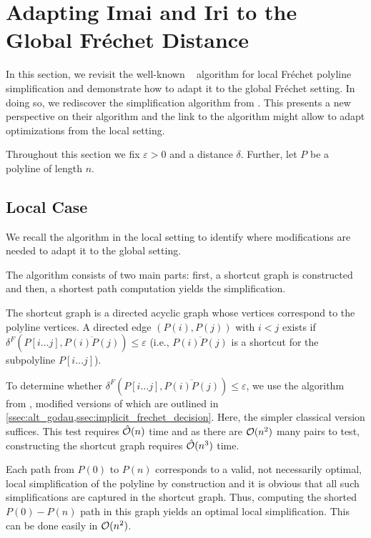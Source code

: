 \section{Adapting Imai and Iri to the Global Fréchet Distance}
\label{sec:global_imai_iri}

In this section, we revisit the well-known \citeauthor{computational_geometric_methods_for_polygonal_approximations_of_a_curve}~\cite{computational_geometric_methods_for_polygonal_approximations_of_a_curve} algorithm for local Fréchet polyline simplification and demonstrate how to adapt it to the global Fréchet setting. In doing so, we rediscover the simplification algorithm from \citeauthor{global_curve_simplification}. This presents a new perspective on their algorithm and the link to the \citeauthor{computational_geometric_methods_for_polygonal_approximations_of_a_curve} algorithm might allow to adapt optimizations from the local setting.

Throughout this section we fix \(\varepsilon > 0\) and a distance \(\delta\). Further, let \(P\) be a polyline of length \(n\).

\subsection{Local Case}

We recall the algorithm in the local setting to identify where modifications are needed to adapt it to the global setting. 

The algorithm consists of two main parts: first, a shortcut graph is constructed and then, a shortest path computation yields the simplification.

The shortcut graph is a directed acyclic graph whose vertices correspond to the polyline vertices. A directed edge \((P(i), P(j))\) with \(i < j\) exists if \(\delta^F(P[i \dots j], \overline{P(i)P(j)}) \leq \varepsilon\) (i.e., \(\overline{P(i)P(j)}\) is a shortcut for the subpolyline \(P[i \dots j]\)). 

To determine whether \(\delta^F(P[i \dots j], \overline{P(i)P(j)}) \leq \varepsilon\), we use the algorithm from \citeauthor{computing_the_frechet_distance_between_two_polygonal_curves}, modified versions of which are outlined in \cref{ssec:alt_godau,ssec:implicit_frechet_decision}. Here, the simpler classical version suffices. This test requires \(\hat{\mathcal{O}}(n)\) time and as there are \(\mathcal{O}(n^2)\) many pairs to test, constructing the shortcut graph requires \(\hat{\mathcal{O}}(n^3)\) time.

Each path from \(P(0)\) to \(P(n)\) corresponds to a valid, not necessarily optimal, local simplification of the polyline by construction and it is obvious that all such simplifications are captured in the shortcut graph. Thus, computing the shorted \(P(0)-P(n)\) path in this graph yields an optimal local simplification. This can be done easily in \(\mathcal{O}(n^2)\).

